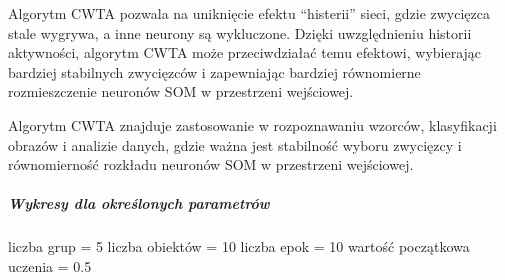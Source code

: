 \documentclass[11pt]{article}
\begin{document}
Algorytm CWTA pozwala na uniknięcie efektu ``histerii'' sieci, gdzie
zwycięzca stale wygrywa, a inne neurony są wykluczone. Dzięki
uwzględnieniu historii aktywności, algorytm CWTA może przeciwdziałać
temu efektowi, wybierając bardziej stabilnych zwycięzców i zapewniając
bardziej równomierne rozmieszczenie neuronów SOM w przestrzeni
wejściowej.

Algorytm CWTA znajduje zastosowanie w rozpoznawaniu wzorców,
klasyfikacji obrazów i analizie danych, gdzie ważna jest stabilność
wyboru zwycięzcy i równomierność rozkładu neuronów SOM w przestrzeni
wejściowej.

\hypertarget{wykresy-dla-okreux15blonych-parametruxf3w-1}{%
\subparagraph{Wykresy dla określonych
parametrów}\label{wykresy-dla-okreux15blonych-parametruxf3w-1}}

liczba grup = 5 liczba obiektów = 10 liczba epok = 10 wartość początkowa
uczenia = 0.5
\end{document}
